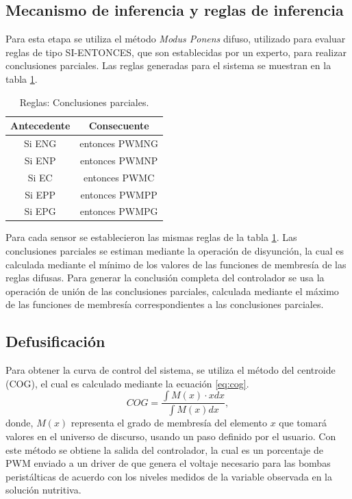 \subsection{Mecanismo de inferencia y reglas de inferencia} Para esta etapa se utiliza el método \textit{Modus Ponens} difuso, utilizado para evaluar reglas de tipo SI-ENTONCES, que son establecidas por un experto, para realizar conclusiones parciales. Las reglas generadas para el sistema se muestran en la tabla \ref{tab:t4}.\\
\begin{table}[H]
\centering
\caption{Reglas: Conclusiones parciales.} 
\begin{tabular}{ c c}
\textbf{Antecedente} & \textbf{Consecuente}\\
\hline
Si ENG & entonces PWMNG\\
Si ENP &entonces PWMNP\\
Si EC &entonces PWMC\\
Si EPP &entonces PWMPP\\
Si EPG &entonces PWMPG\\
\hline
\end{tabular}
\label{tab:t4}
\end{table}
Para cada sensor se establecieron las mismas reglas de la tabla \ref{tab:t4}. Las conclusiones parciales se estiman mediante la operación de disyunción, la cual es calculada mediante el mínimo de los valores de las funciones de membresía de las reglas difusas. Para generar la conclusión completa del controlador se usa la operación de unión de las conclusiones parciales, calculada mediante el máximo de las funciones de membresía correspondientes a las conclusiones parciales.

\subsection{Defusificación}
Para obtener la curva de control del sistema, se utiliza el método del centroide (COG), el cual es calculado mediante la ecuación \ref{eq:cog}.
\begin{equation}
    \label{eq:cog}
    COG=\frac{\int M(x)\cdot xdx}{\int M(x)dx},
\end{equation}
donde, $M(x)$ representa el grado de membresía del elemento $x$ que tomará valores en el universo de discurso, usando un paso definido por el usuario. Con este método se obtiene la salida del controlador, la cual es un porcentaje de PWM enviado a un driver de que genera el voltaje necesario para las bombas peristálticas de acuerdo con los niveles medidos de la variable observada en la solución nutritiva.

